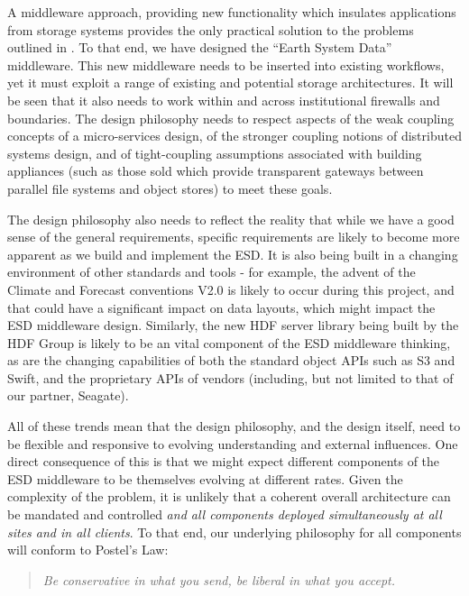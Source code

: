 A middleware approach, providing new functionality which insulates applications from storage systems provides the only practical solution to the problems outlined in .
To that end, we have designed the ``Earth System Data'' middleware.
This new middleware needs to be inserted into existing workflows, yet it must exploit a range of existing and potential storage architectures.
It will be seen that it also needs to work within and across institutional firewalls and boundaries. The design philosophy needs to respect aspects of the weak coupling concepts of a micro-services design, of the stronger coupling notions of distributed systems design, and of tight-coupling assumptions associated with building appliances (such as those sold which provide transparent gateways between parallel file systems and object stores) to meet these goals.

The design philosophy also needs to reflect the reality that while we have a good sense of the general requirements, specific requirements are likely to become more apparent as we build and implement the ESD.
It is also being built in a changing environment of other standards and tools - for example, the advent of the Climate and Forecast conventions V2.0 is likely to occur during this project, and that could have a significant impact on data layouts, which might impact the ESD middleware design. Similarly, the new HDF server library being built by the HDF Group is likely to be an vital component of the ESD middleware thinking, as are the changing capabilities of both the standard object APIs such as S3 and Swift, and the proprietary APIs of vendors (including, but not limited to that of our partner, Seagate).

All of these trends mean that the design philosophy, and the design itself, need to be flexible and responsive to evolving understanding and external influences.
One direct consequence of this is that we might expect different components of the ESD middleware to be themselves evolving at different rates.
Given the complexity of the problem, it is unlikely that a coherent overall architecture can be mandated and controlled \textit{and all components deployed simultaneously at all sites and in all clients}. To that end, our underlying philosophy for all components will conform to Postel's Law:
\begin{quote}
\textit{Be conservative in what you send, be liberal in what you accept.}
\end{quote}






